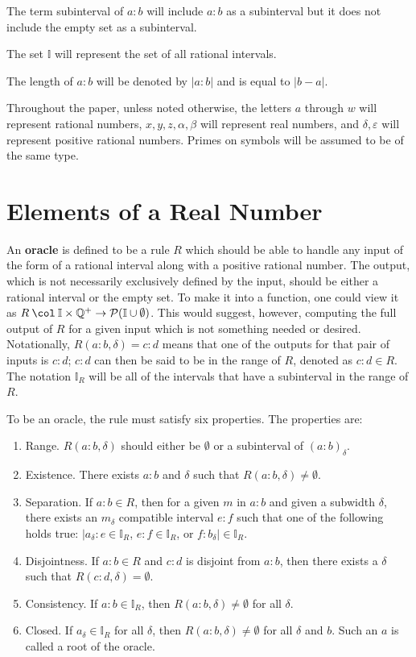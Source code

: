 \documentclass[12pt]{article}
\begin{document}
The term subinterval of $a:b$ will include $a:b$ as a subinterval but it does not include the empty set as a subinterval. 

The set $\mathbb{I}$ will represent the set of all rational intervals. 

The length of $a:b$ will be denoted by $|a:b|$ and is equal to $|b-a|$.

Throughout the paper, unless noted otherwise, the letters $a$ through $w$ will represent rational numbers, $x, y, z, \alpha, \beta$ will represent real numbers, and $\delta, \varepsilon$ will represent positive rational numbers. Primes on symbols will be assumed to be of the same type. 

\section{Elements of a Real Number}

An \textbf{oracle} is defined to be a rule $R$ which should be able to handle any input of the form of a rational interval along with a positive rational number. The output, which is not necessarily exclusively defined by the input, should be either a rational interval or the empty set. To make it into a function, one could view it as $R \mathbin{\col} \mathbb{I} \times \mathbb{Q}^+ \to \mathcal{P}(\mathbb{I} \cup \emptyset)$. This would suggest, however, computing the full output of $R$ for a given input which is not something needed or desired. Notationally, $R(a:b, \delta) = c:d$ means that one of the outputs for that pair of inputs is $c:d$; $c:d$ can then be said to be in the range of $R$, denoted as $c:d \in R$. The notation $\mathbb{I}_R$ will be all of the intervals that have a subinterval in the range of $R$.

To be an oracle, the rule must satisfy six properties.  The properties are:
\begin{enumerate}
    \item Range. $R(a:b, \delta)$ should either be $\emptyset$ or a subinterval of $(a:b)_\delta$. 
    \item Existence. There exists $a:b$ and $\delta$ such that $R(a:b, \delta) \neq \emptyset$.
    \item Separation. 
    If $a:b \in R$, then for a given $m$ in $a:b$ and given a subwidth $\delta$, there exists an $m_\delta$ compatible interval $e:f$ such that one of the following holds true:  $|a_\delta:e \in \mathbb{I}_R$, $e:f \in \mathbb{I}_R$,  or $f:b_{\delta}| \in \mathbb{I}_R$.
   \item Disjointness. If $a:b \in R$ and $c:d$ is disjoint from $a:b$, then there exists a $\delta$ such that $R(c:d, \delta) = \emptyset$.
    \item Consistency. If $a:b  \in \mathbb{I}_R$, then $R(a:b, \delta) \neq \emptyset$ for all $\delta$.
    \item Closed. If $a_\delta \in \mathbb{I}_R$ for all $\delta $, then $R(a:b, \delta) \neq \emptyset$ for all $\delta$ and $b$. Such an $a$ is called a root of the oracle. 
\end{enumerate}
\end{document}
